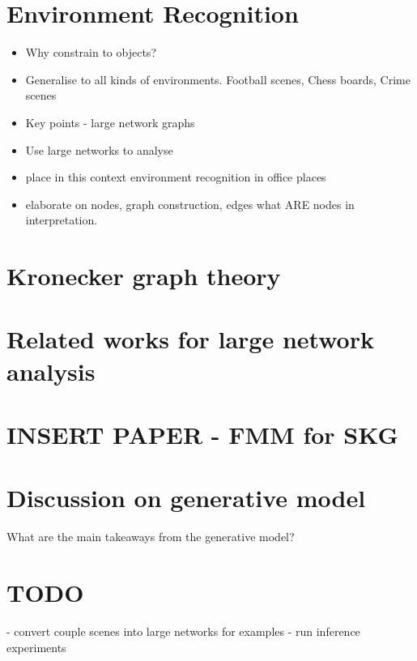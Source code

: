 \section{Environment Recognition}
\begin{itemize}
\item Why constrain to objects?
\item Generalise to all kinds of environments. Football scenes, Chess boards, Crime scenes
\item Key points - large network graphs
\item Use large networks to analyse
\item place in this context environment recognition in office places
\item elaborate on nodes, graph construction, edges what ARE nodes in interpretation.
\end{itemize}
\section{Kronecker graph theory}
\section{Related works for large network analysis}
\section{INSERT PAPER - FMM for SKG}
\section{Discussion on generative model}
What are the main takeaways from the generative model?
\section{TODO}
- convert couple scenes into large networks for examples
- run inference experiments